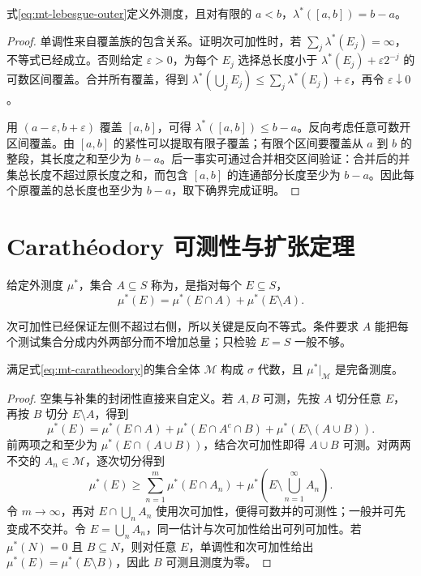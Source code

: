 \documentclass[UTF8,12pt,a4paper,fontset=fandol]{ctexbook}
\begin{document}
\begin{proposition}
式\eqref{eq:mt-lebesgue-outer}定义外测度，且对有限的 $a<b$，$\lambda^*([a,b])=b-a$。
\end{proposition}
\begin{proof}
单调性来自覆盖族的包含关系。证明次可加性时，若 $\sum_j\lambda^*(E_j)=\infty$，不等式已经成立。否则给定 $\varepsilon>0$，为每个 $E_j$ 选择总长度小于 $\lambda^*(E_j)+\varepsilon2^{-j}$ 的可数区间覆盖。合并所有覆盖，得到 $\lambda^*(\bigcup_jE_j)\leq\sum_j\lambda^*(E_j)+\varepsilon$，再令 $\varepsilon\downarrow0$。

用 $(a-\varepsilon,b+\varepsilon)$ 覆盖 $[a,b]$，可得 $\lambda^*([a,b])\leq b-a$。反向考虑任意可数开区间覆盖。由 $[a,b]$ 的紧性可以提取有限子覆盖；有限个区间要覆盖从 $a$ 到 $b$ 的整段，其长度之和至少为 $b-a$。后一事实可通过合并相交区间验证：合并后的并集总长度不超过原长度之和，而包含 $[a,b]$ 的连通部分长度至少为 $b-a$。因此每个原覆盖的总长度也至少为 $b-a$，取下确界完成证明。
\end{proof}

\section{Carathéodory 可测性与扩张定理}
\begin{definition}
给定外测度 $\mu^*$，集合 $A\subseteq S$ 称为，是指对每个 $E\subseteq S$，
\begin{equation}
 \mu^*(E)=\mu^*(E\cap A)+\mu^*(E\setminus A).
 \label{eq:mt-caratheodory}
\end{equation}
\end{definition}
次可加性已经保证左侧不超过右侧，所以关键是反向不等式。条件要求 $A$ 能把每个测试集合分成内外两部分而不增加总量；只检验 $E=S$ 一般不够。

\begin{theorem}
满足式\eqref{eq:mt-caratheodory}的集合全体 $\mathcal M$ 构成 $\sigma$ 代数，且 $\mu^*|_{\mathcal M}$ 是完备测度。
\label{thm:mt-caratheodory}
\end{theorem}
\begin{proof}
空集与补集的封闭性直接来自定义。若 $A,B$ 可测，先按 $A$ 切分任意 $E$，再按 $B$ 切分 $E\setminus A$，得到
\[
 \mu^*(E)=\mu^*(E\cap A)+\mu^*(E\cap A^c\cap B)
             +\mu^*(E\setminus(A\cup B)).
\]
前两项之和至少为 $\mu^*(E\cap(A\cup B))$，结合次可加性即得 $A\cup B$ 可测。对两两不交的 $A_n\in\mathcal M$，逐次切分得到
\[
 \mu^*(E)\geq\sum_{n=1}^{m}\mu^*(E\cap A_n)
       +\mu^*\!\left(E\setminus\bigcup_{n=1}^{\infty}A_n\right).
\]
令 $m\to\infty$，再对 $E\cap\bigcup_nA_n$ 使用次可加性，便得可数并的可测性；一般并可先变成不交并。令 $E=\bigcup_nA_n$，同一估计与次可加性给出可列可加性。若 $\mu^*(N)=0$ 且 $B\subseteq N$，则对任意 $E$，单调性和次可加性给出 $\mu^*(E)=\mu^*(E\setminus B)$，因此 $B$ 可测且测度为零。
\end{proof}
\end{document}
